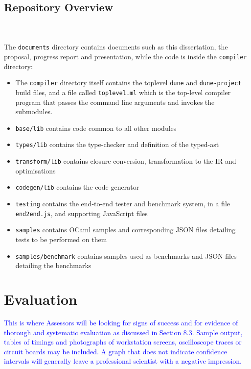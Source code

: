 \documentclass[12pt,twoside,notitlepage]{report}
\newcommand{\textinline}{\texttt}
\newcommand\note[1]{\textcolor{blue}{#1}}
\begin{document}
\section{Repository Overview}
\begin{minipage}{\linewidth}
\end{minipage}
\\\\
The \textinline{documents} directory contains documents such as this dissertation, the proposal, progress report and presentation, while the code is inside the \textinline{compiler} directory:
\begin{itemize}
	\item The \textinline{compiler} directory itself contains the toplevel \textinline{dune} and \textinline{dune-project} build files, and a file called \textinline{toplevel.ml} which is the top-level compiler program that passes the command line arguments and invokes the submodules.
	\item \textinline{base/lib} contains code common to all other modules
	\item \textinline{types/lib} contains the type-checker and definition of the typed-ast
	\item \textinline{transform/lib} contains closure conversion, transformation to the IR and optimisations
	\item \textinline{codegen/lib} contains the code generator
	\item \textinline{testing} contains the end-to-end tester and benchmark system, in a file \textinline{end2end.js}, and supporting JavaScript files
	\item \textinline{samples} contains OCaml samples and corresponding JSON files detailing tests to be performed on them
	\item \textinline{samples/benchmark} contains samples used as benchmarks and JSON files detailing the benchmarks
\end{itemize}



\clearpage
\chapter{Evaluation}
\note{This is where Assessors will be looking for signs of success and for evidence of thorough and systematic evaluation as discussed in Section 8.3. Sample output, tables of timings and photographs of workstation screens, oscilloscope traces or circuit boards may be included. A graph that does not indicate confidence intervals will generally leave a professional scientist with a negative impression.}
\end{document}

